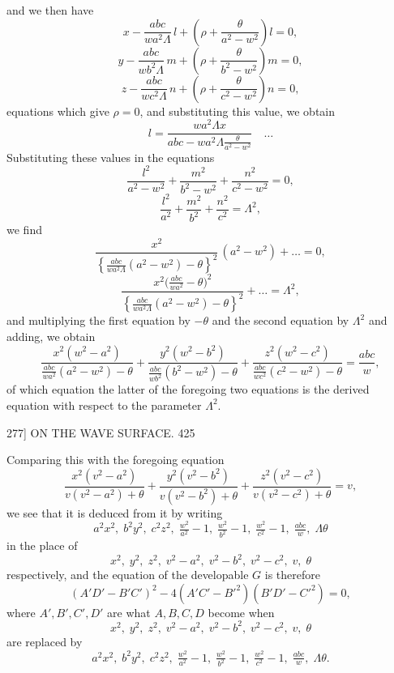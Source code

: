 \documentclass[11pt]{article}
\begin{document}
and we then have
\[ x-\frac{abc}{w a^{2}\Lambda}\,l+\left(\rho+\frac{\theta}{a^{2}-w^{2}}\right)l=0, \]
\[ y-\frac{abc}{w b^{2}\Lambda}\,m+\left(\rho+\frac{\theta}{b^{2}-w^{2}}\right)m=0, \]
\[ z-\frac{abc}{w c^{2}\Lambda}\,n+\left(\rho+\frac{\theta}{c^{2}-w^{2}}\right)n=0, \]
equations which give $\rho=0$, and substituting this value, we obtain
\[ l=\frac{wa^{2}\Lambda x}{abc-w a^{2}\Lambda\tfrac{\theta}{a^{2}-w^{2}}}\quad\dots \]
Substituting these values in the equations
\[ \frac{l^{2}}{a^{2}-w^{2}}+\frac{m^{2}}{b^{2}-w^{2}}+\frac{n^{2}}{c^{2}-w^{2}}=0, \]
\[ \frac{l^{2}}{a^{2}}+\frac{m^{2}}{b^{2}}+\frac{n^{2}}{c^{2}}=\Lambda^{2}, \]
we find
\[ \frac{x^{2}}{\left\{\tfrac{abc}{w a^{2}\Lambda}(a^{2}-w^{2})-\theta\right\}^{2}}\,(a^{2}-w^{2})+\dots=0, \]
\[ \frac{x^{2}\bigl(\tfrac{abc}{w a^{2}}-\theta\bigr)^{2}}{\left\{\tfrac{abc}{w a^{2}\Lambda}(a^{2}-w^{2})-\theta\right\}^{2}}+\dots=\Lambda^{2}, \]
and multiplying the first equation by $-\theta$ and the second equation by $\Lambda^{2}$ and adding,
we obtain
\[ \frac{x^{2}(w^{2}-a^{2})}{\tfrac{abc}{w a^{2}}(a^{2}-w^{2})-\theta}+\frac{y^{2}(w^{2}-b^{2})}{\tfrac{abc}{w b^{2}}(b^{2}-w^{2})-\theta}+\frac{z^{2}(w^{2}-c^{2})}{\tfrac{abc}{w c^{2}}(c^{2}-w^{2})-\theta}=\frac{abc}{w}, \]
of which equation the latter of the foregoing two equations is the derived equation
with respect to the parameter $\Lambda^{2}$.

\begin{center}
\textsc{277]} \hfill ON THE WAVE SURFACE. \hfill 425
\end{center}

Comparing this with the foregoing equation
\[ \frac{x^{2}(v^{2}-a^{2})}{v(v^{2}-a^{2})+\theta}+\frac{y^{2}(v^{2}-b^{2})}{v(v^{2}-b^{2})+\theta}+\frac{z^{2}(v^{2}-c^{2})}{v(v^{2}-c^{2})+\theta}=v, \]
we see that it is deduced from it by writing
\[ a^{2}x^{2},\;b^{2}y^{2},\;c^{2}z^{2},\;\tfrac{w^{2}}{a^{2}}-1,\;\tfrac{w^{2}}{b^{2}}-1,\;\tfrac{w^{2}}{c^{2}}-1,\;\tfrac{abc}{w},\;\Lambda\theta \]
in the place of
\[ x^{2},\;y^{2},\;z^{2},\;v^{2}-a^{2},\;v^{2}-b^{2},\;v^{2}-c^{2},\;v,\;\theta \]
respectively, and the equation of the developable $G$ is therefore
\[ (A'D'-B'C')^{2}-4(A'C'-B'^{2})(B'D'-C'^{2})=0, \]
where $A',B',C',D'$ are what $A,B,C,D$ become when
\[ x^{2},\;y^{2},\;z^{2},\;v^{2}-a^{2},\;v^{2}-b^{2},\;v^{2}-c^{2},\;v,\;\theta \]
are replaced by
\[ a^{2}x^{2},\;b^{2}y^{2},\;c^{2}z^{2},\;\tfrac{w^{2}}{a^{2}}-1,\;\tfrac{w^{2}}{b^{2}}-1,\;\tfrac{w^{2}}{c^{2}}-1,\;\tfrac{abc}{w},\;\Lambda\theta. \]
\end{document}
